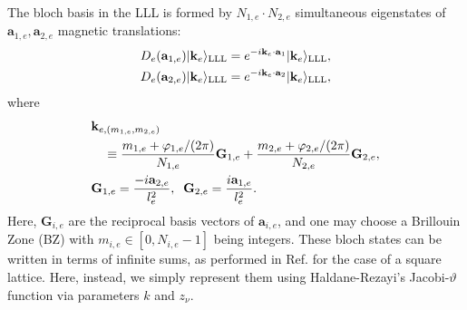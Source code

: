 The bloch basis in the LLL is formed by $N_{1,e}\cdot N_{2,e}$ simultaneous eigenstates of $\mathbf a_{1,e},\mathbf a_{2,e}$ magnetic translations:
\begin{align}
D_e(\mathbf a_{1,e})|\mathbf k_e\rangle_{\text{LLL}}&=e^{-i\mathbf k_e\cdot \mathbf a_1}|\mathbf k_e\rangle_{\text{LLL}},\notag\\
D_e(\mathbf a_{2,e})|\mathbf k_e\rangle_{\text{LLL}}&=e^{-i\mathbf k_e\cdot \mathbf a_2}|\mathbf k_e\rangle_{\text{LLL}},\label{eq:bloch_condition}
\end{align}
where 
\begin{align}
&\mathbf k_{e,(m_{1,e},m_{2,e})}\notag\\
&\quad\equiv \frac{m_{1,e}+\varphi_{1,e}/(2\pi)}{N_{1,e}} \mathbf G_{1,e} + \frac{m_{2,e}+\varphi_{2,e}/(2\pi)}{N_{2,e}} \mathbf G_{2,e},\label{eq:k_e_vals}\\
&\mathbf G_{1,e}=\frac{-i\mathbf a_{2,e}}{l_e^2}, \;\;\mathbf G_{2,e}=\frac{i\mathbf a_{1,e}}{l_e^2}.\notag
\end{align}
Here, $\mathbf G_{i,e}$ are the reciprocal basis vectors of $\mathbf a_{i,e}$, and one may choose a Brillouin Zone (BZ) with $m_{i,e}\in [0,N_{i,e}-1]$ being integers. These bloch states can be written in terms of infinite sums, as performed in Ref.\cite{jian2013crystal,murthy2012hamiltonian} for the case of a square lattice. Here, instead, we simply represent them using Haldane-Rezayi's Jacobi-$\vartheta$ function via parameters $k$ and $z_\nu$.

